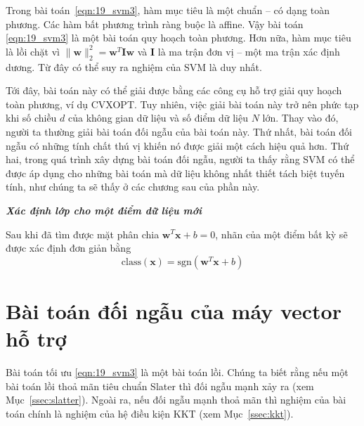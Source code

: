 Trong bài toán~\eqref{eqn:19_svm3}, hàm mục tiêu
là một chuẩn -- có dạng toàn phương. Các hàm bất phương trình ràng buộc là affine. Vậy bài toán
\eqref{eqn:19_svm3} là một bài toán quy hoạch toàn phương. Hơn nữa, hàm mục tiêu là lồi chặt vì $\|\mathbf{w}\|_2^2 = \mathbf{w}^T\mathbf{I}\mathbf{w}$ và
$\mathbf{I}$ là ma trận đơn vị -- một ma trận xác định dương. Từ đây có thể
suy ra nghiệm của SVM là {duy nhất}.
 
Tới đây, bài toán này có thể giải được bằng các công cụ hỗ trợ giải quy hoạch toàn phương, ví dụ CVXOPT. Tuy nhiên, việc giải bài toán này trở nên
phức tạp khi số chiều $d$ của không gian dữ liệu và số điểm dữ liệu $N$ lớn. Thay vào đó, người ta thường giải bài toán đối ngẫu của bài toán này. Thứ
nhất, bài toán đối ngẫu có những tính chất thú vị khiến nó được giải một
cách hiệu quả hơn. Thứ hai, trong quá trình xây dựng bài toán đối ngẫu, người ta
thấy rằng SVM có thể được áp dụng cho những bài toán mà dữ liệu không nhất thiết tách biệt tuyến tính, như chúng ta sẽ thấy ở các chương sau của phần này.

 
 
\textit{\textbf{Xác định lớp cho một điểm dữ liệu mới} }

Sau khi đã tìm được mặt phân chia $\mathbf{w}^T\mathbf{x} + b = 0$, nhãn của
một điểm bất kỳ sẽ được xác định đơn giản bằng 
\begin{equation*} 
\text{class}(\mathbf{x}) = \text{sgn} (\mathbf{w}^T\mathbf{x} + b ) 
\end{equation*} 
 
\section{Bài toán đối ngẫu của máy vector hỗ trợ} 
\label{sec:19_svm3} 
Bài toán tối ưu \eqref{eqn:19_svm3} là một bài toán lồi. Chúng ta
biết rằng nếu một bài toán lồi thoả mãn tiêu chuẩn Slater thì đối ngẫu mạnh xảy ra (xem Mục~\ref{ssec:slatter}). Ngoài ra, nếu đối ngẫu mạnh
thoả mãn thì nghiệm của bài toán chính là nghiệm của hệ điều kiện KKT (xem
Mục~\ref{ssec:kkt}).
 
 
